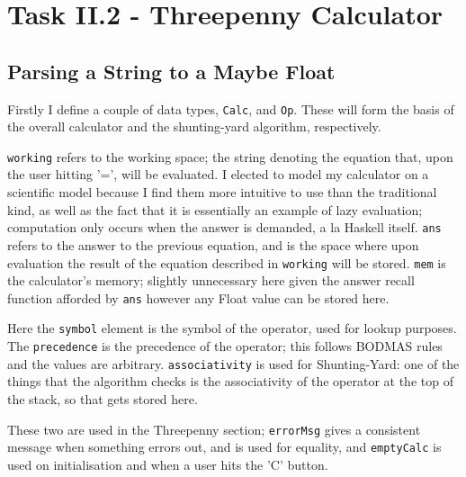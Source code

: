 \documentclass[12pt]{article}
\begin{document}
\pagebreak


\section{Task II.2 - Threepenny Calculator}

\subsection{Parsing a String to a Maybe Float}

Firstly I define a couple of data types, \verb|Calc|, and \verb|Op|. These will form the basis of the overall calculator and the shunting-yard algorithm, respectively.



\verb|working| refers to the working space; the string denoting the equation that, upon the user hitting '=', will be evaluated.
I elected to model my calculator on a scientific model because I find them more intuitive to use than the traditional kind, as well as the fact that it is essentially an example of lazy evaluation; computation only occurs when the answer is demanded, a la Haskell itself.
\verb|ans| refers to the answer to the previous equation, and is the space where upon evaluation the result of the equation described in \verb|working| will be stored.
\verb|mem| is the calculator's memory; slightly unnecessary here given the answer recall function afforded by \verb|ans| however any Float value can be stored here.



Here the \verb|symbol| element is the symbol of the operator, used for lookup purposes.
The \verb|precedence| is the precedence of the operator; this follows BODMAS rules and the values are arbitrary.
\verb|associativity| is used for Shunting-Yard: one of the things that the algorithm checks is the associativity of the operator at the top of the stack, so that gets stored here.



These two are used in the Threepenny section; \verb|errorMsg| gives a consistent message when something errors out, and is used for equality, and \verb|emptyCalc| is used on initialisation and when a user hits the 'C' button.
\end{document}
